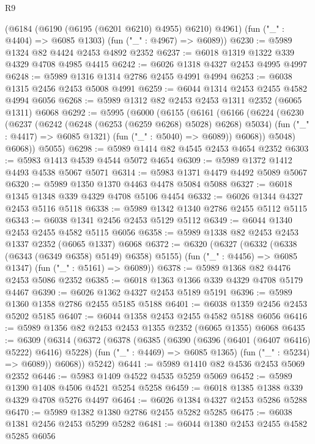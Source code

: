 \begin{lexlean}{R9}
\begin{coremodule}
      (@6184 (@6190 (@6195 (@6201 @6210) @4955) @6210) @4961)
      (fun ("_" : @4404) => @6085 @1303)
      (fun ("_" : @4967) => @6089))
@6230 := @5989 @1324 @82 @4424 @2453 @4892 @2352
@6237 := @6018 @1319 @1322 @339 @4329 @4708 @4985 @4415
@6242 := @6026 @1318 @4327 @2453 @4995 @4997
@6248 := @5989 @1316 @1314 @2786 @2455 @4991 @4994
@6253 := @6038 @1315 @2456 @2453 @5008 @4991
@6259 := @6044 @1314 @2453 @2455 @4582 @4994 @6056
@6268 := @5989 @1312 @82 @2453 @2453 @1311 @2352 (@6065 @1311) @6068
@6292 := @5995
    (@6000
      (@6155
        (@6161
          (@6166
            (@6224
              (@6230
                (@6237
                  (@6242 (@6248 (@6253 (@6259 @6268) @5028) @6268) @5034)
                  (fun ("_" : @4417) => @6085 @1321)
                  (fun ("_" : @5040) => @6089))
                @6068))
            @5048)
          @6068))
      @5055)
@6298 := @5989 @1414 @82 @4545 @2453 @4654 @2352
@6303 := @5983 @1413 @4539 @4544 @5072 @4654
@6309 := @5989 @1372 @1412 @4493 @4538 @5067 @5071
@6314 := @5983 @1371 @4479 @4492 @5089 @5067
@6320 := @5989 @1350 @1370 @4463 @4478 @5084 @5088
@6327 := @6018 @1345 @1348 @339 @4329 @4708 @5106 @4454
@6332 := @6026 @1344 @4327 @2453 @5116 @5118
@6338 := @5989 @1342 @1340 @2786 @2455 @5112 @5115
@6343 := @6038 @1341 @2456 @2453 @5129 @5112
@6349 := @6044 @1340 @2453 @2455 @4582 @5115 @6056
@6358 := @5989 @1338 @82 @2453 @2453 @1337 @2352 (@6065 @1337) @6068
@6372 := @6320
    (@6327
      (@6332 (@6338 (@6343 (@6349 @6358) @5149) @6358) @5155)
      (fun ("_" : @4456) => @6085 @1347)
      (fun ("_" : @5161) => @6089))
@6378 := @5989 @1368 @82 @4476 @2453 @5086 @2352
@6385 := @6018 @1363 @1366 @339 @4329 @4708 @5179 @4467
@6390 := @6026 @1362 @4327 @2453 @5189 @5191
@6396 := @5989 @1360 @1358 @2786 @2455 @5185 @5188
@6401 := @6038 @1359 @2456 @2453 @5202 @5185
@6407 := @6044 @1358 @2453 @2455 @4582 @5188 @6056
@6416 := @5989 @1356 @82 @2453 @2453 @1355 @2352 (@6065 @1355) @6068
@6435 := @6309
    (@6314
      (@6372
        (@6378
          (@6385
            (@6390 (@6396 (@6401 (@6407 @6416) @5222) @6416) @5228)
            (fun ("_" : @4469) => @6085 @1365)
            (fun ("_" : @5234) => @6089))
          @6068))
      @5242)
@6441 := @5989 @1410 @82 @4536 @2453 @5069 @2352
@6446 := @5983 @1409 @4522 @4535 @5259 @5069
@6452 := @5989 @1390 @1408 @4506 @4521 @5254 @5258
@6459 := @6018 @1385 @1388 @339 @4329 @4708 @5276 @4497
@6464 := @6026 @1384 @4327 @2453 @5286 @5288
@6470 := @5989 @1382 @1380 @2786 @2455 @5282 @5285
@6475 := @6038 @1381 @2456 @2453 @5299 @5282
@6481 := @6044 @1380 @2453 @2455 @4582 @5285 @6056

\end{coremodule}
\end{lexlean}
